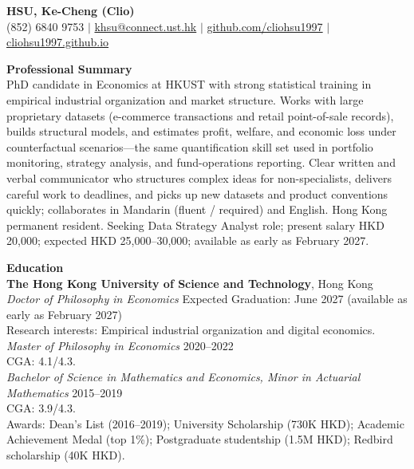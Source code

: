 \documentclass[11pt,letterpaper]{article}
\begin{document}
{\Large \textbf{HSU, Ke-Cheng (Clio)}}\\[1pt]
(852) 6840 9753 \quad $|$ \quad \href{mailto:khsu@connect.ust.hk}{khsu@connect.ust.hk} \quad $|$ \quad \href{https://github.com/cliohsu1997}{github.com/cliohsu1997} \quad $|$ \quad \href{https://cliohsu1997.github.io/}{cliohsu1997.github.io}

\vspace{0.15pt}

{\large \textbf{Professional Summary}}\\[-0.5pt]
PhD candidate in Economics at HKUST with strong statistical training in empirical industrial organization and market structure. Works with large proprietary datasets (e-commerce transactions and retail point-of-sale records), builds structural models, and estimates profit, welfare, and economic loss under counterfactual scenarios---the same quantification skill set used in portfolio monitoring, strategy analysis, and fund-operations reporting. Clear written and verbal communicator who structures complex ideas for non-specialists, delivers careful work to deadlines, and picks up new datasets and product conventions quickly; collaborates in Mandarin (fluent / required) and English. Hong Kong permanent resident. Seeking Data Strategy Analyst role; present salary HKD 20,000; expected HKD 25,000--30,000; available as early as February 2027.

\vspace{0.15pt}

{\large \textbf{Education}}\\[-0.5pt]
\textbf{The Hong Kong University of Science and Technology}, Hong Kong\\
\textit{Doctor of Philosophy in Economics} \hfill Expected Graduation: June 2027 (available as early as February 2027)\\
Research interests: Empirical industrial organization and digital economics.\\
\textit{Master of Philosophy in Economics} \hfill 2020--2022\\
CGA: 4.1/4.3.\\
\textit{Bachelor of Science in Mathematics and Economics, Minor in Actuarial Mathematics} \hfill 2015--2019\\
CGA: 3.9/4.3.\\
Awards: Dean's List (2016--2019); University Scholarship (730K HKD); Academic Achievement Medal (top 1\%); Postgraduate studentship (1.5M HKD); Redbird scholarship (40K HKD).

\vspace{0.15pt}
\end{document}
